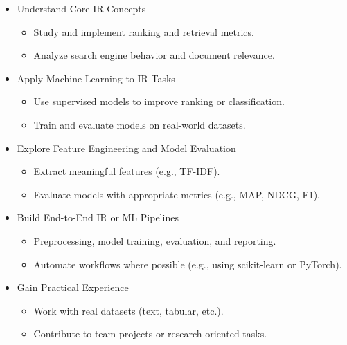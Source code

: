 \documentclass[12pt,a4paper]{article}
\begin{document}
\begin{itemize}
  \item Understand Core IR Concepts
\begin{itemize}


  \item Study and implement ranking and retrieval metrics.

\item Analyze search engine behavior and document relevance.
\end{itemize}


\item Apply Machine Learning to IR Tasks
\begin{itemize}

\item Use supervised models to improve ranking or classification.

\item Train and evaluate models on real-world datasets.
\end{itemize}


\item Explore Feature Engineering and Model Evaluation
\begin{itemize}

\item Extract meaningful features (e.g., TF-IDF).

\item Evaluate models with appropriate metrics (e.g., MAP, NDCG, F1).
\end{itemize}


\item Build End-to-End IR or ML Pipelines
\begin{itemize}

\item Preprocessing, model training, evaluation, and reporting.

\item Automate workflows where possible (e.g., using scikit-learn or PyTorch).
\end{itemize}


\item Gain Practical Experience
\begin{itemize}

\item Work with real datasets (text, tabular, etc.).

\item Contribute to team projects or research-oriented tasks.
\end{itemize}

\end{itemize}
\end{document}
